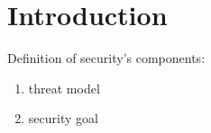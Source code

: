 \section{Introduction}
Definition of security's components:
\begin{enumerate}
    \item threat model
    \item security goal
\end{enumerate}